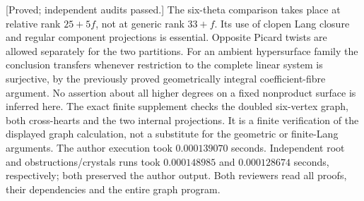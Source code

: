\begin{remark}
\label{rem:nonordinary-ppav-degree-two-scope-candidate}
\textup{[Proved; independent audits passed.]}
The six-theta comparison takes place at relative rank $25+5f$,
not at generic rank $33+f$. Its use of clopen Lang closure and
regular component projections is essential. Opposite Picard
twists are allowed separately for the two partitions.
For an ambient hypersurface family the conclusion transfers
whenever restriction to the complete linear system is surjective,
by the previously proved geometrically integral coefficient-fibre
argument. No assertion about all higher degrees on a fixed
nonproduct surface is inferred here. The exact finite supplement
checks the doubled six-vertex graph, both cross-hearts and the
two internal projections. It is a finite verification of the
displayed graph calculation, not a substitute for the geometric
or finite-Lang arguments. The author execution took
$0.000139070$ seconds. Independent root and obstructions/crystals
runs took $0.000148985$ and $0.000128674$ seconds, respectively;
both preserved the author output. Both reviewers read all proofs,
their dependencies and the entire graph program.
\end{remark}
